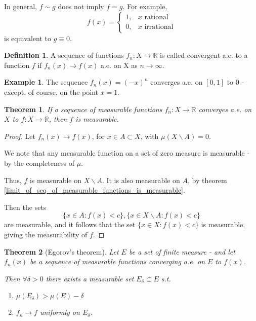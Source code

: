 \documentclass[11pt,a4paper]{report}
\theoremstyle{plain}
\newtheorem{thm}{Theorem}[section]
\theoremstyle{definition}
\newtheorem*{defn}{Definition}
\newtheorem*{eg}{Example}
\theoremstyle{remark}
\newcommand{\R}{\mathbb{R}}
\begin{document}
In general, $f \sim g$ does not imply $f = g$. For example,
$$ f(x) = \begin{cases}
    1, &x \text{ rational} \\
    0, &x \text{ irrational}
  \end{cases} $$ is equivalent to $g \equiv 0$.

\begin{defn}
  A sequence of functions $f_n : X \rightarrow \R$ is called convergent a.e. to a function $f$ if $f_n(x) \rightarrow f(x)$ a.e. on X as $n \rightarrow \infty$. 
\end{defn}

\begin{eg}
  The sequence $f_n(x) = (-x)^n$ converges a.e. on $[0, 1]$ to $0$ - except, of course, on the point $x = 1$.
\end{eg}

\begin{thm}\label{limit_of_ae_measurable_sequence_is_measurable}
  If a sequence of measurable functions $f_n : X \rightarrow \R$ converges a.e. on $X$ to $f: X \rightarrow \R$, then $f$ is measurable.
\end{thm}

\begin{proof}
  Let $f_n(x) \rightarrow f(x)$, for $x \in A \subset X$, with $\mu(X \backslash A) = 0$.

  We note that any measurable function on a set of zero measure is measurable - by the completeness of $\mu$.

  Thus, $f$ is measurable on $X \backslash A$. It is also measurable on $A$, by theorem \ref{limit_of_seq_of_measurable_functions_is_measurable}.

  Then the sets $$ \{ x \in A : f(x) < c \}, \{ x \in X \backslash A : f(x) < c \} $$ are measurable, and it follows that the set $\{ x \in X : f(x) < c \}$ is measurable, giving the measurability of $f$.
\end{proof}

\begin{thm}[Egorov's theorem]
    Let $E$ be a set of finite measure - and let $f_n(x)$ be a sequence of measurable functions converging a.e. on $E$ to $f(x)$. 

    Then $\forall \delta > 0$ there exists a measurable set $E_\delta \subset E$ s.t. 
    \begin{enumerate}
        \item $\mu(E_\delta) > \mu(E) - \delta$
        \item $f_n \rightarrow f$ uniformly on $E_\delta$.
    \end{enumerate}
\end{thm}
\end{document}
